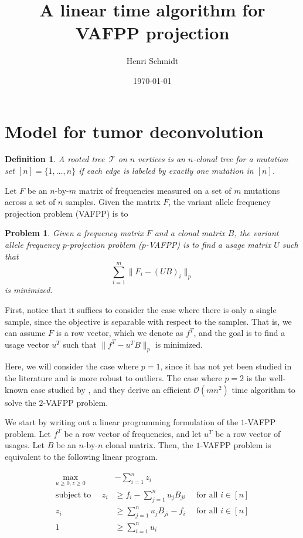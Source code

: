 \documentclass[11pt]{article}
\title{A linear time algorithm for VAFPP projection}
\author{Henri Schmidt}
\date{\today}
\newtheorem{definition}{Definition}
\newtheorem{problem}{Problem}
\newcommand{\tree}{\mathcal{T}}
\begin{document}
\maketitle

\section{Model for tumor deconvolution}

\begin{definition}
  A rooted tree $\,\tree$ on $n$ vertices is an $n$-clonal tree 
  for a mutation set $[n] = \{1, \ldots, n\}$ if each edge is
  labeled by exactly one mutation in $[n]$.
\end{definition}

Let $F$ be an $n$-by-$m$ matrix of frequencies measured on
a set of $m$ mutations across a set of $n$ samples. Given the
matrix $F$, the variant allele frequency projection problem (VAFPP) is to

\begin{problem}
  \label{prob:vafpp}
  Given a frequency matrix $F$ and a clonal matrix $B$, the 
  \emph{variant allele frequency $p$-projection problem} ($p$-VAFPP) is to
  find a usage matrix $U$ such that 
  \begin{equation}
    \sum_{i=1}^m\lVert F_i - (UB)_i \rVert_p
  \end{equation}
  is minimized.
\end{problem}

First, notice that it suffices to consider the case where there is only a
single sample, since the objective is separable with respect to the samples. 
That is, we can assume $F$ is a row vector, which we denote as $f^T$, and the
goal is to find a usage vector $u^T$ such that $\lVert f^T - u^TB \rVert_p$ is minimized.

Here, we will consider the case where $p = 1$, since it has not yet been 
studied in the literature and is more robust to outliers. 
The case where $p = 2$ is the well-known case studied by \cite{jia_efficient_2018},
and they derive an efficient $\mathcal{O}(mn^2)$ time algorithm to solve the
$2$-VAFPP problem.

We start by writing out a linear programming formulation of the $1$-VAFPP problem.
Let $f^T$ be a row vector of frequencies, and let $u^T$ be a row vector of usages.
Let $B$ be an $n$-by-$n$ clonal matrix. Then, the $1$-VAFPP problem is equivalent
to the following linear program.

\begin{mdframed}
\begin{align}
  \max_{u \geq 0, z \geq 0} &-\sum_{i=1}^n z_i \nonumber \\
  \text{subject to }\quad z_i &\geq f_i - \sum_{j=1}^n u_j B_{ji} \quad\text{ for all } i \in [n] \label{eq:constr1} \\
  z_i &\geq \sum_{j=1}^n u_j B_{ji} - f_i \quad\text{ for all } i \in [n] \label{eq:constr2} \\
  1 &\geq \sum_{i=1}^n u_i \label{eq:constr3}
\end{align}
\end{mdframed}
\end{document}
